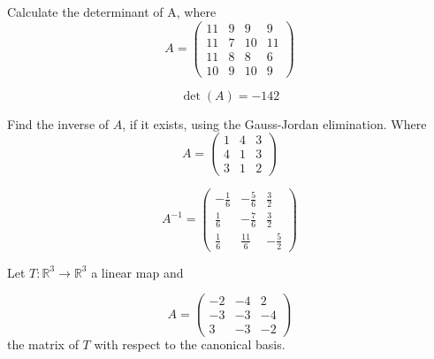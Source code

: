 \begin{questions}

\question Calculate the determinant of A, where
$$
A=\left(\begin{array}{rrrr}
11 & 9 & 9 & 9 \\
11 & 7 & 10 & 11 \\
11 & 8 & 8 & 6 \\
10 & 9 & 10 & 9
\end{array}\right)
$$

\begin{solution}
$$\det(A)=-142$$
\end{solution}

\question Find the inverse of $A$, if it exists, using the Gauss-Jordan elimination. Where
$$
A=\left(\begin{array}{rrr}
1 & 4 & 3 \\
4 & 1 & 3 \\
3 & 1 & 2
\end{array}\right)
$$

\begin{solution}
$$A^{-1}=\left(\begin{array}{rrr}
-\frac{1}{6} & -\frac{5}{6} & \frac{3}{2} \\
\frac{1}{6} & -\frac{7}{6} & \frac{3}{2} \\
\frac{1}{6} & \frac{11}{6} & -\frac{5}{2}
\end{array}\right)$$
\end{solution}

\question Let $T:\mathbb{R}^3\rightarrow\mathbb{R}^3$  a linear map and
 
$$
A=\left(\begin{array}{rrr}
-2 & -4 & 2 \\
-3 & -3 & -4 \\
3 & -3 & -2
\end{array}\right)
$$
the matrix of $T$ with respect to the canonical basis.
\end{questions}
